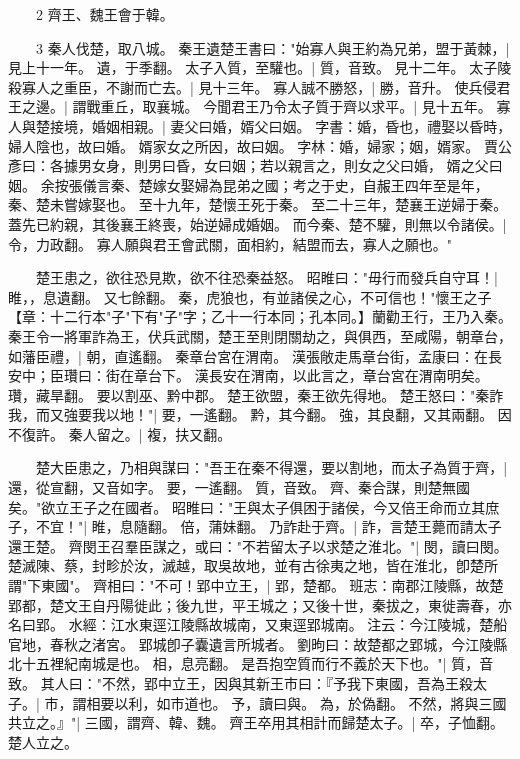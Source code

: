 　　2 齊王、魏王會于韓。


　　3 秦人伐楚，取八城。
	秦王遺楚王書曰："始寡人與王約為兄弟，盟于黃棘，|{
	見上十一年。
	遺，于季翻。
}
太子入質，至驩也。|{
	質，音致。
	見十二年。
}
太子陵殺寡人之重臣，不謝而亡去。|{
	見十三年。
}
寡人誠不勝怒，|{
	勝，音升。
}
使兵侵君王之邊。|{
	謂戰重丘，取襄城。
}
今聞君王乃令太子質于齊以求平。|{
	見十五年。
}
寡人與楚接境，婚姻相親。|{
	妻父曰婚，婿父曰姻。
	字書：婚，昏也，禮娶以昏時，婦人陰也，故曰婚。
	婿家女之所因，故曰姻。
	字林：婚，婦家；姻，婿家。
	賈公彥曰：各據男女身，則男曰昏，女曰姻；若以親言之，則女之父曰婚， 婿之父曰姻。
	余按張儀言秦、楚嫁女娶婦為昆弟之國；考之于史，自赧王四年至是年，秦、楚未嘗嫁娶也。
	至十九年，楚懷王死于秦。
	至二十三年，楚襄王逆婦于秦。
	蓋先已約親，其後襄王終喪，始逆婦成婚姻。
}
而今秦、楚不驩，則無以令諸侯。|{
	令，力政翻。
}
寡人願與君王會武關，面相約，結盟而去，寡人之願也。"

　　楚王患之，欲往恐見欺，欲不往恐秦益怒。
	昭睢曰："毋行而發兵自守耳！|{
	睢，，息遺翻。
	又七餘翻。
}
秦，虎狼也，有並諸侯之心，不可信也！"懷王之子【章：十二行本"子"下有"子"字；乙十一行本同；孔本同。】蘭勸王行，王乃入秦。
	秦王令一將軍詐為王，伏兵武關，楚王至則閉關劫之，與俱西，至咸陽，朝章台，如藩臣禮，|{
	朝，直遙翻。
	秦章台宮在渭南。
	漢張敞走馬章台街，孟康曰：在長安中；臣瓚曰：街在章台下。
	漢長安在渭南，以此言之，章台宮在渭南明矣。
	瓚，藏旱翻。
}
要以割巫、黔中郡。
	楚王欲盟，秦王欲先得地。
	楚王怒曰："秦詐我，而又強要我以地！"|{
	要，一遙翻。
	黔，其今翻。
	強，其良翻，又其兩翻。
}
因不復許。
	秦人留之。|{
	複，扶又翻。
}

　　楚大臣患之，乃相與謀曰："吾王在秦不得還，要以割地，而太子為質于齊，|{
	還，從宣翻，又音如字。
	要，一遙翻。
	質，音致。
}
齊、秦合謀，則楚無國矣。"欲立王子之在國者。
	昭睢曰："王與太子俱困于諸侯，今又倍王命而立其庶子，不宜！"|{
	睢，息隨翻。
	倍，蒲妹翻。
}
乃詐赴于齊。|{
	詐，言楚王薨而請太子還王楚。
}
齊閔王召羣臣謀之，或曰："不若留太子以求楚之淮北。"|{
	閔，讀曰閔。
	楚滅陳、蔡，封畛於汝，滅越，取吳故地，並有古徐夷之地，皆在淮北，卽楚所謂"下東國"。
}
齊相曰："不可！郢中立王，|{
	郢，楚都。
	班志：南郡江陵縣，故楚郢都，楚文王自丹陽徙此；後九世，平王城之；又後十世，秦拔之，東徙壽春，亦名曰郢。
	水經：江水東逕江陵縣故城南，又東逕郢城南。
	注云：今江陵城，楚船官地，春秋之渚宮。
	郢城卽子囊遺言所城者。
	劉昫曰：故楚都之郢城，今江陵縣北十五裡紀南城是也。
	相，息亮翻。
}
是吾抱空質而行不義於天下也。"|{
	質，音致。
}
其人曰："不然，郢中立王，因與其新王市曰：『予我下東國，吾為王殺太子。|{
	巿，謂相要以利，如巿道也。
	予，讀曰與。
	為，於偽翻。
}
不然，將與三國共立之。』"|{
	三國，謂齊、韓、魏。
}
齊王卒用其相計而歸楚太子。|{
	卒，子恤翻。
}
楚人立之。


